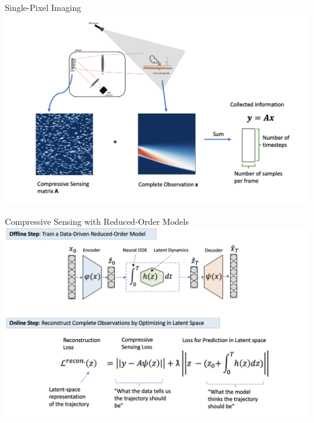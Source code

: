 \documentclass[8pt]{beamer}
\begin{document}
\begin{frame}{Single-Pixel Imaging}
	\includegraphics[width=\textwidth]{Figures/spi_math.png}
\end{frame}


\begin{frame}{Compressive Sensing with Reduced-Order Models}
	\includegraphics[width=\textwidth]{Figures/cs_schematics.png}
\end{frame}
\end{document}

